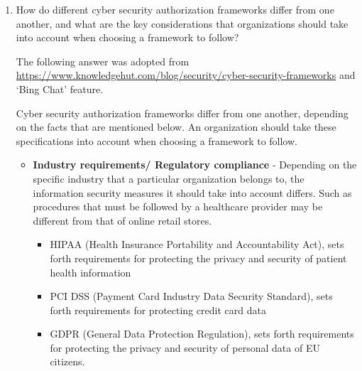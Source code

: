 \documentclass[11pt,letterpaper]{article}
\newenvironment{answer}{\em \color{blue} \begin{adjustwidth}{1cm}{1cm}}{\end{adjustwidth}}
\begin{document}
\begin{enumerate}
\begin{answer}
\begin{itemize}
			
			\item \textbf{Performance and scale} - Organizations need to make sure that their systems can handle the ever increasing demands of the authorization process. However, this process involves communication between various system components which essentially can slow down the system. Focusing on modernizing applications and systems that take advantage of cloud technologies is a way to address this issue, as they often have better integration with authorization tools.
		\end{itemize}
		
		\end{answer}
		
		\item How do different cyber security authorization frameworks differ from one another, and what are the key considerations that organizations should take into account when choosing a framework to follow?
		
		\begin{answer}
			The following answer was adopted from \url{https://www.knowledgehut.com/blog/security/cyber-security-frameworks} and `Bing Chat' feature.
			
			
			Cyber security authorization frameworks differ from one another, depending on the facts that are mentioned below. An organization should take these specifications into account when choosing a framework to follow.
			
			\begin{itemize}
				\item \textbf{Industry requirements/ Regulatory compliance} - Depending on the specific industry that a particular organization belongs to, the information security measures it should take into account differs. Such as procedures that must be followed by a healthcare provider may be different from that of online retail stores.
				\begin{itemize}
					\item HIPAA (Health Insurance Portability and Accountability Act), sets forth requirements for protecting the privacy and security of patient health information
					\item PCI DSS (Payment Card Industry Data Security Standard),  sets forth requirements for protecting credit card data
					\item GDPR (General Data Protection Regulation), sets forth requirements for protecting the privacy and security of personal data of EU citizens.
				\end{itemize}
				

\end{itemize}
\end{answer}
\end{enumerate}
\end{document}
